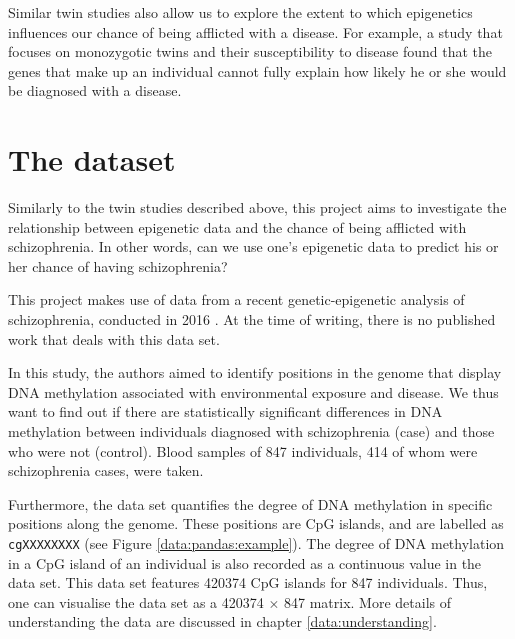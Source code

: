 \documentclass[12pt, twoside, a4paper]{report}
\begin{document}
Similar twin studies also allow us to explore the extent to which epigenetics influences our chance of being afflicted with a disease. For example, a study \cite{RefWorks:105} that focuses on monozygotic twins and their susceptibility to disease found that the genes that make up an individual cannot fully explain how likely he or she would be diagnosed with a disease.

\section{The dataset} \label{bg_genetic_data}

Similarly to the twin studies described above, this project aims to investigate the relationship between epigenetic data and the chance of being afflicted with schizophrenia. In other words, can we use one's epigenetic data to predict his or her chance of having schizophrenia?

This project makes use of data from a recent genetic-epigenetic analysis of schizophrenia, conducted in 2016 \cite{RefWorks:78}. At the time of writing, there is no published work that deals with this data set.


In this study, the authors aimed to identify positions in the genome that display DNA methylation associated with environmental exposure and disease. We thus want to find out if there are statistically significant differences in DNA methylation between individuals diagnosed with schizophrenia (case) and those who were not (control). Blood samples of 847 individuals, 414 of whom were schizophrenia cases, were taken.

Furthermore, the data set quantifies the degree of DNA methylation in specific positions along the genome. These positions are CpG islands, and are labelled as \texttt{cgXXXXXXXX} (see Figure \ref{data:pandas:example}). The degree of DNA methylation in a CpG island of an individual is also recorded as a continuous value in the data set. This data set features 420374 CpG islands for 847 individuals. Thus, one can visualise the data set as a 420374 $\times$ 847 matrix. More details of understanding the data are discussed in chapter \ref{data:understanding}.

\end{document}
